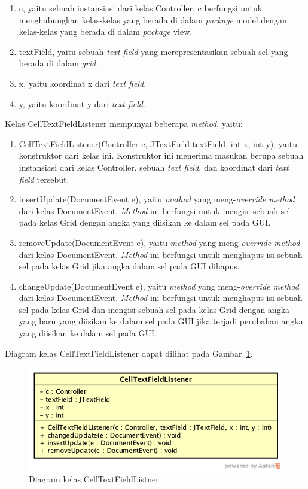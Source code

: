 \begin{enumerate}
\item c, yaitu sebuah instansiasi dari kelas Controller. c berfungsi untuk menghubungkan kelas-kelas yang berada di dalam \textit{package} model dengan kelas-kelas yang berada di dalam \textit{package} view.
\item textField, yaitu sebuah \textit{text field} yang merepresentasikan sebuah sel yang berada di dalam \textit{grid}.
\item x, yaitu koordinat x dari \textit{text field}.
\item y, yaitu koordinat y dari \textit{text field}.
\end{enumerate}

Kelas CellTextFieldListener mempunyai beberapa \textit{method}, yaitu:

\begin{enumerate}
\item CellTextFieldListener(Controller c, JTextField textField, int x, int y), yaitu konstruktor dari kelas ini. Konstruktor ini menerima masukan berupa sebuah instansiasi dari kelas Controller, sebuah \textit{text field}, dan koordinat dari \textit{text field} tersebut.
\item insertUpdate(DocumentEvent e), yaitu \textit{method} yang meng-\textit{override method} dari kelas DocumentEvent. \textit{Method} ini berfungsi untuk mengisi sebuah sel pada kelas Grid dengan angka yang diisikan ke dalam sel pada GUI.
\item removeUpdate(DocumentEvent e), yaitu \textit{method} yang meng-\textit{override method} dari kelas DocumentEvent. \textit{Method} ini berfungsi untuk menghapus isi sebuah sel pada kelas Grid jika angka dalam sel pada GUI dihapus.
\item changeUpdate(DocumentEvent e), yaitu \textit{method} yang meng-\textit{override method} dari kelas DocumentEvent. \textit{Method} ini berfungsi untuk menghapus isi sebuah sel pada kelas Grid dan mengisi sebuah sel pada kelas Grid dengan angka yang baru yang diisikan ke dalam sel pada GUI jika terjadi perubahan angka yang diisikan ke dalam sel pada GUI.
\end{enumerate}

Diagram kelas CellTextFieldListener dapat dilihat pada Gambar~\ref{fig:diagramkelascelltextfieldlistener}.

\begin{figure}
\centering
\captionsetup{justification=centering}
\includegraphics[scale=0.5]{Gambar/Perancangan/DiagramKelasCellTextFieldListener.png}
\caption[Diagram kelas CellTextFieldListener.]{Diagram kelas CellTextFieldListner.}
\label{fig:diagramkelascelltextfieldlistener}
\end{figure}

